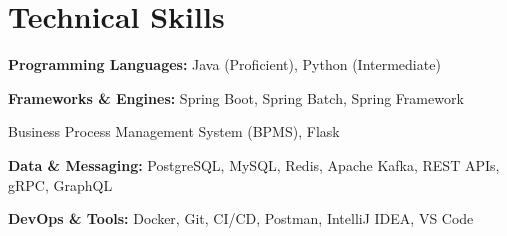 \section*{Technical Skills}
\noindent\makebox[\linewidth]{\rule{\textwidth}{0.2pt}}

\textbf{Programming Languages:} Java (Proficient), Python (Intermediate)
\vspace{2pt}

\textbf{Frameworks \& Engines:} Spring Boot, Spring Batch, Spring Framework

Business Process Management System (BPMS), Flask
\vspace{2pt}

\textbf{Data \& Messaging:} PostgreSQL, MySQL, Redis, Apache Kafka, REST APIs, gRPC, GraphQL
\vspace{2pt}

\textbf{DevOps \& Tools:} Docker, Git, CI/CD, Postman, IntelliJ IDEA, VS Code